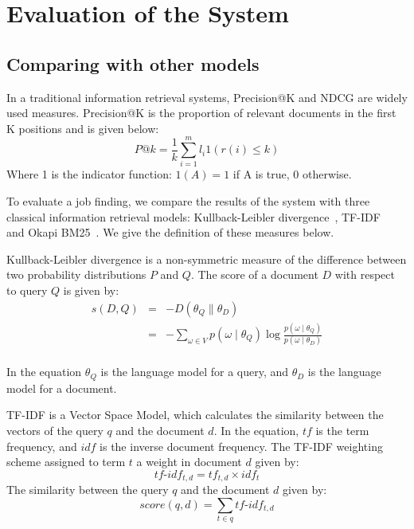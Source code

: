 \section{Evaluation of the System}
\label{sec1}

\subsection{Comparing with other models}

In a traditional information retrieval systems, Precision@K and NDCG are widely used measures. 
Precision@K is the proportion of relevant documents in the first K positions and is given below:
$$ P@k = \frac{1}{k} \sum^m_{i=1} l_i 1 \left(  r(i) \leq k  \right )  $$
Where 1 is the indicator function: $1(A) = 1$ if A is true, 0 otherwise.

To evaluate a job finding, we compare the results of the system with three classical information retrieval models: Kullback-Leibler divergence~\cite{zhai2008statistical},  TF-IDF~\cite{manning2008introduction} and Okapi BM25~\cite{robertson1995okapi}. We give the definition of these measures below.

Kullback-Leibler divergence is a non-symmetric measure of the difference between two probability distributions $P$ and $Q$. The score of a document $D$ with respect to query $Q$ is given by:
\begin{equation}
    \begin{array}{rcl}
        s(D,Q) & = & -D( \theta_Q \parallel  \theta_D )\\
               & = &- \sum_{ \omega \in V } p (\omega \mid \theta_Q) \log \frac{ p (\omega \mid \theta_Q )}{p(\omega \mid \theta_D)} \\               

    \end{array}
\end{equation}

In the equation $\theta_Q$ is the language model for a query, and  $\theta_D$ is the language model for a document.

TF-IDF is a Vector Space Model, which calculates the similarity between the vectors of the query $q$ and the document $d$. In the equation, $tf$ is the term frequency, and $idf$ is the inverse document frequency. The TF-IDF weighting scheme assigned to term $t$ a weight in document $d$ given by:
$$ tf\text{-}idf_{t,d} = tf_{t,d} \times idf_{t} $$
The similarity between the query $q$ and the document $d$ given by:
$$ score(q,d) =  \sum_{t \in q }  tf\text{-}idf_{t,d} $$

